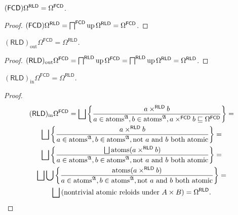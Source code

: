 \begin{prop}
  $(\mathsf{FCD}) \Omega^{\mathsf{RLD}} =
  \Omega^{\mathsf{FCD}}$.
\end{prop}

\begin{proof}
  $(\mathsf{FCD}) \Omega^{\mathsf{RLD}} =
  \bigsqcap^{\mathsf{FCD}} \operatorname{up} \Omega^{\mathsf{RLD}} =
  \Omega^{\mathsf{FCD}}$.
\end{proof}

\begin{prop}
  $(\mathsf{RLD})_{\operatorname{out}} \Omega^{\mathsf{FCD}} =
  \Omega^{\mathsf{RLD}}$.
\end{prop}

\begin{proof}
  $(\mathsf{RLD})_{\operatorname{out}} \Omega^{\mathsf{FCD}} =
  \bigsqcap^{\mathsf{RLD}} \operatorname{up} \Omega^{\mathsf{FCD}} =
  \bigsqcap^{\mathsf{RLD}} \operatorname{up} \Omega^{\mathsf{RLD}} =
  \Omega^{\mathsf{RLD}}$.
\end{proof}

\begin{prop}
  $(\mathsf{RLD})_{\operatorname{in}} \Omega^{\mathsf{FCD}} = \Omega^{\mathsf{RLD}}$.
\end{prop}

\begin{proof}
  \begin{multline*}
  (\mathsf{RLD})_{\operatorname{in}} \Omega^{\mathsf{FCD}} = \bigsqcup
  \setcond{ a \times^{\mathsf{RLD}} b }{ a \in
  \atoms^{\mathfrak{A}}, b \in \atoms^{\mathfrak{A}}, a
  \times^{\mathsf{FCD}} b \sqsubseteq \Omega^{\mathsf{FCD}}
  } = \\
  \bigsqcup \setcond{ a \times^{\mathsf{RLD}} b }{
  a \in \atoms^{\mathfrak{A}}, b \in
  \atoms^{\mathfrak{A}}, \text{not $a$ and $b$ both atomic} } = \\
  \bigsqcup \setcond{ \bigsqcup \atoms (a \times^{\mathsf{RLD}} b)
  }{ a \in \atoms^{\mathfrak{A}}, b \in
  \atoms^{\mathfrak{A}}, \text{not $a$ and $b$ both atomic} } = \\
  \bigsqcup \bigcup \setcond{ \atoms (a \times^{\mathsf{RLD}} b) }{
  a \in \atoms^{\mathfrak{A}}, b \in
  \atoms^{\mathfrak{A}}, \text{not $a$ and $b$ both atomic} } = \\
  \bigsqcup \left( \text{nontrivial atomic reloids under $A \times B$} \right) =
  \Omega^{\mathsf{RLD}}.
  \end{multline*}
\end{proof}

